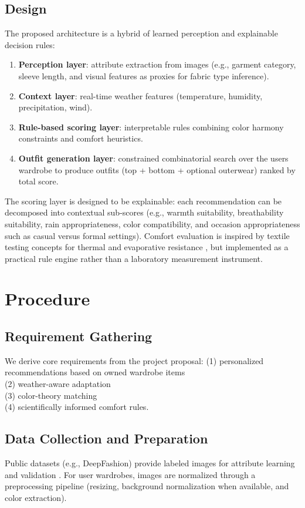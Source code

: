 \documentclass[stu,man]{apa7}
\begin{document}
\subsection{Design}
The proposed architecture is a hybrid of learned perception and explainable decision rules:
\begin{enumerate}
  \item \textbf{Perception layer}: attribute extraction from images (e.g., garment category, sleeve length, and visual features as proxies for fabric type inference).
  \item \textbf{Context layer}: real-time weather features (temperature, humidity, precipitation, wind).
  \item \textbf{Rule-based scoring layer}: interpretable rules combining color harmony constraints and comfort heuristics.
  \item \textbf{Outfit generation layer}: constrained combinatorial search over the user\textquotesingle s wardrobe to produce outfits (top + bottom + optional outerwear) ranked by total score.
\end{enumerate}

The scoring layer is designed to be explainable: each recommendation can be decomposed into contextual sub-scores (e.g., warmth suitability, breathability suitability, rain appropriateness, color compatibility, and occasion appropriateness such as casual versus formal settings).
Comfort evaluation is inspired by textile testing concepts for thermal and evaporative resistance \parencite{iso11092}, but implemented as a practical rule engine rather than a laboratory measurement instrument.
\newpage
\section{Procedure}
\subsection{Requirement Gathering}
We derive core requirements from the project proposal: (1) personalized recommendations based on owned wardrobe items\\ (2) weather-aware adaptation\\ (3) color-theory matching\\ (4) scientifically informed comfort rules.

\subsection{Data Collection and Preparation}
Public datasets (e.g., DeepFashion) provide labeled images for attribute learning and validation \parencite{liuLQWTcvpr16DeepFashion}.
For user wardrobes, images are normalized through a preprocessing pipeline (resizing, background normalization when available, and color extraction).
\end{document}
